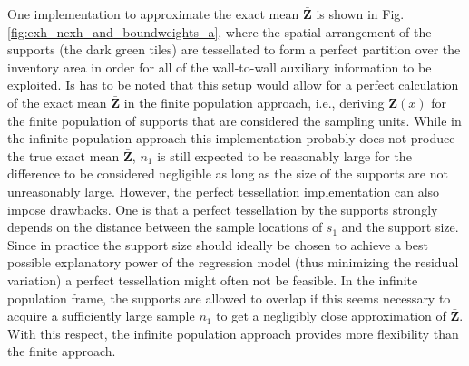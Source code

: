 One implementation to approximate the exact mean $\bar{\pmb{Z}}$ is shown in Fig. \ref{fig:exh_nexh_and_boundweights_a}, where the spatial arrangement of the supports (the dark green tiles) are tessellated to form a perfect partition over the inventory area in order for all of the wall-to-wall auxiliary information to be exploited. Is has to be noted that this setup would allow for a perfect calculation of the exact mean $\bar{\pmb{Z}}$ in the finite population approach, i.e., deriving $\pmb{Z}(x)$ for the finite population of supports that are considered the sampling units. While in the infinite population approach this implementation probably does not produce the true exact mean $\bar{\pmb{Z}}$, $n_1$ is still expected to be reasonably large for the difference to be considered negligible as long as the size of the supports are not unreasonably large. However, the perfect tessellation implementation can also impose drawbacks. One is that a perfect tessellation by the supports strongly depends on the distance between the sample locations of $s_1$ and the support size. Since in practice the support size should ideally be chosen to achieve a best possible explanatory power of the regression model (thus minimizing the residual variation) a perfect tessellation might often not be feasible. In the infinite population frame, the supports are allowed to overlap if this seems necessary to acquire a sufficiently large sample $n_1$ to get a negligibly close approximation of $\bar{\pmb{Z}}$. With this respect, the infinite population approach provides more flexibility than the finite approach.

